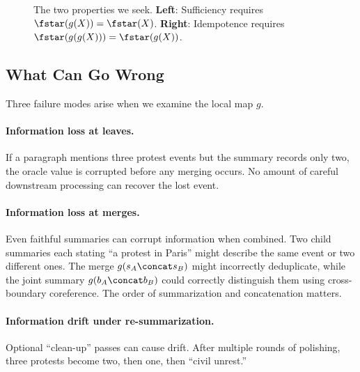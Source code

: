 \begin{figure}[t]
    \centering
    \caption{The two properties we seek. \textbf{Left}: Sufficiency requires $\fstar(g(X)) = \fstar(X)$. \textbf{Right}: Idempotence requires $\fstar(g(g(X))) = \fstar(g(X))$.}
    \label{fig:gstar}
\end{figure}

\subsection{What Can Go Wrong}\label{sec:what-can-go-wrong}

Three failure modes arise when we examine the local map $g$.

\paragraph{Information loss at leaves.}
If a paragraph mentions three protest events but the summary records only two, the oracle value is corrupted before any merging occurs. No amount of careful downstream processing can recover the lost event.

\paragraph{Information loss at merges.}
Even faithful summaries can corrupt information when combined. Two child summaries each stating ``a protest in Paris'' might describe the same event or two different ones. The merge $g(s_A \concat s_B)$ might incorrectly deduplicate, while the joint summary $g(b_A \concat b_B)$ could correctly distinguish them using cross-boundary coreference. The order of summarization and concatenation matters.

\paragraph{Information drift under re-summarization.}
Optional ``clean-up'' passes can cause drift. After multiple rounds of polishing, three protests become two, then one, then ``civil unrest.''

